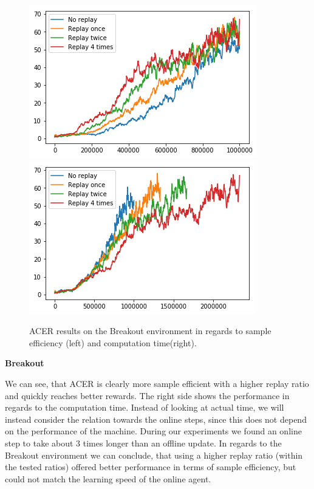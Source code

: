 \begin{figure}[h]
\includegraphics[scale=0.55]{bilder/breakoutbyonline.png}
\includegraphics[scale=0.55]{bilder/breakoutbytime.png}
\caption{ACER results on the Breakout environment in regards to sample efficiency (left) and computation time(right).}
\end{figure}
\textbf{Breakout}

We can see, that ACER is clearly more sample efficient with a higher replay ratio and quickly reaches better rewards. 
The right side shows the performance in regards to the computation time. Instead of looking at actual time, we will instead consider the relation towards the online steps, since this does not depend on the performance of the machine. During our experiments we found an online step to take about 3 times longer than an offline update.
In regards to the Breakout environment we can conclude, that using a higher replay ratio (within the tested ratios) offered better performance in terms of sample efficiency, but could not match the learning speed of the online agent.


